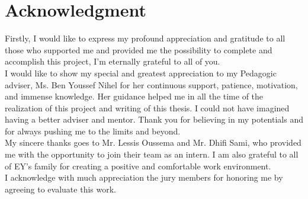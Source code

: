 
\chapter{Acknowledgment}

 
Firstly, I would like to express my profound appreciation and gratitude to all those who supported me and provided me the possibility to complete and accomplish this project, I’m eternally grateful to all of you.\\

I would like to show my special and greatest appreciation to my Pedagogic adviser, Ms. Ben Youssef Nihel for her continuous support, patience, motivation, and immense knowledge. Her guidance helped me in all the time of the realization of this project and writing of this thesis. I could not have imagined having a better adviser and mentor. Thank you for believing in my potentials and for always pushing me to the limits and beyond.\\

My sincere thanks goes to Mr. Lessis Oussema and Mr. Dhifi Sami, who provided me with the opportunity to join their team as an intern. I am also grateful to all of EY’s family for creating a positive and comfortable work environment.\\

I acknowledge with much appreciation the jury members for honoring me by agreeing to evaluate this work.